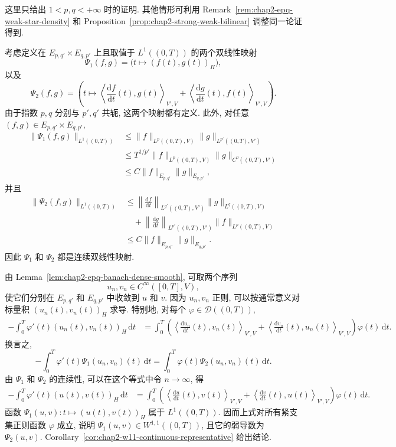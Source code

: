 \begin{Proof}
这里只给出 $1<p,q<+\infty$ 时的证明. 其他情形可利用 Remark~\ref{rem:chap2-epq-weak-star-density} 和 Proposition~\ref{prop:chap2-strong-weak-bilinear} 调整同一论证得到.

考虑定义在 $E_{p,q'}\times E_{q,p'}$ 上且取值于 $L^1((0,T))$ 的两个双线性映射
\[
 \Psi_1(f,g)=\bigl(t\mapsto(f(t),g(t))_H\bigr),
\]
以及
\[
 \Psi_2(f,g)=
 \left(t\mapsto
 \left\langle\frac{\mathrm{d}f}{\mathrm{d}t}(t),g(t)\right\rangle_{V',V}
 +\left\langle\frac{\mathrm{d}g}{\mathrm{d}t}(t),f(t)\right\rangle_{V',V}
 \right).
\]
由于指数 $p,q$ 分别与 $p',q'$ 共轭, 这两个映射都有定义. 此外, 对任意 $(f,g)\in E_{p,q'}\times E_{q,p'}$,
\begin{align*}
 \|\Psi_1(f,g)\|_{L^1((0,T))}
 &\leq\|f\|_{L^p((0,T),V)}\|g\|_{L^{p'}((0,T),V')}\\
 &\leq T^{1/p'}\|f\|_{L^p((0,T),V)}\|g\|_{C^0((0,T),V')}\\
 &\leq C\|f\|_{E_{p,q'}}\|g\|_{E_{q,p'}},
\end{align*}
并且
\begin{align*}
 \|\Psi_2(f,g)\|_{L^1((0,T))}
 &\leq
 \left\|\frac{\mathrm{d}f}{\mathrm{d}t}\right\|_{L^{q'}((0,T),V')}
 \|g\|_{L^q((0,T),V)}\\
 &\quad+
 \left\|\frac{\mathrm{d}g}{\mathrm{d}t}\right\|_{L^{p'}((0,T),V')}
 \|f\|_{L^p((0,T),V)}\\
 &\leq C\|f\|_{E_{p,q'}}\|g\|_{E_{q,p'}}.
\end{align*}
因此 $\Psi_1$ 和 $\Psi_2$ 都是连续双线性映射.

由 Lemma~\ref{lem:chap2-epq-banach-dense-smooth}, 可取两个序列
\[
 u_n,v_n\in C^\infty([0,T],V),
\]
使它们分别在 $E_{p,q'}$ 和 $E_{q,p'}$ 中收敛到 $u$ 和 $v$. 因为 $u_n,v_n$ 正则, 可以按通常意义对标量积 $(u_n(t),v_n(t))_H$ 求导. 特别地, 对每个 $\varphi\in\mathcal{D}((0,T))$,
\begin{align*}
 -\int_0^T\varphi'(t)(u_n(t),v_n(t))_H\,\mathrm{d}t
 &=\int_0^T\left(
 \left\langle\frac{\mathrm{d}u_n}{\mathrm{d}t}(t),v_n(t)\right\rangle_{V',V}
 +\left\langle\frac{\mathrm{d}v_n}{\mathrm{d}t}(t),u_n(t)\right\rangle_{V',V}
 \right)\varphi(t)\,\mathrm{d}t.
\end{align*}
换言之,
\[
 -\int_0^T\varphi'(t)\Psi_1(u_n,v_n)(t)\,\mathrm{d}t
 =\int_0^T\varphi(t)\Psi_2(u_n,v_n)(t)\,\mathrm{d}t.
\]
由 $\Psi_1$ 和 $\Psi_2$ 的连续性, 可以在这个等式中令 $n\to\infty$, 得
\begin{align*}
 -\int_0^T\varphi'(t)(u(t),v(t))_H\,\mathrm{d}t
 &=\int_0^T\left(
 \left\langle\frac{\mathrm{d}u}{\mathrm{d}t}(t),v(t)\right\rangle_{V',V}
 +\left\langle\frac{\mathrm{d}v}{\mathrm{d}t}(t),u(t)\right\rangle_{V',V}
 \right)\varphi(t)\,\mathrm{d}t.
\end{align*}
函数 $\Psi_1(u,v):t\mapsto(u(t),v(t))_H$ 属于 $L^1((0,T))$. 因而上式对所有紧支集正则函数 $\varphi$ 成立, 说明 $\Psi_1(u,v)\in W^{1,1}((0,T))$, 且它的弱导数为 $\Psi_2(u,v)$. Corollary~\ref{cor:chap2-w11-continuous-representative} 给出结论.
\end{Proof}

